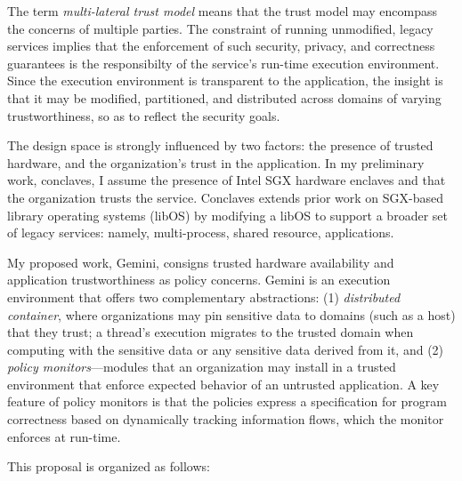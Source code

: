 

The term \emph{multi-lateral trust model} means that the trust model may
encompass the concerns of multiple parties.
%
The constraint of running unmodified, legacy services implies that the
enforcement of such security, privacy, and correctness guarantees is the
responsibilty of the service's run-time execution environment. 
%
Since the execution environment is transparent to the application, the insight
is that it may be modified, partitioned, and distributed across domains of
varying trustworthiness, so as to reflect the security goals.


The design space is strongly influenced by two factors: the presence of trusted
hardware, and the organization's trust in the application.
%
%
In my preliminary work, conclaves, I assume the presence of Intel SGX hardware
enclaves and that the organization trusts the service.
%
Conclaves extends prior work on SGX-based library operating systems (libOS) by
modifying a libOS to support a broader set of legacy services: namely,
multi-process, shared resource, applications.

%


My proposed work, Gemini, consigns trusted hardware availability and
application trustworthiness as policy concerns.
%
Gemini is an execution environment that offers two complementary abstractions:
(1) \emph{distributed container}, where organizations may pin sensitive data to
domains (such as a host) that they trust; a thread's execution migrates to the
trusted domain when computing with the sensitive data or any sensitive data
derived from it, and (2) \emph{policy monitors}---modules that an organization
may install in a trusted environment that enforce expected behavior of an
untrusted application.
%
A key feature of policy monitors is that the policies express a specification
for program correctness based on dynamically tracking information flows, which
the monitor enforces at run-time.

This proposal is organized as follows:

